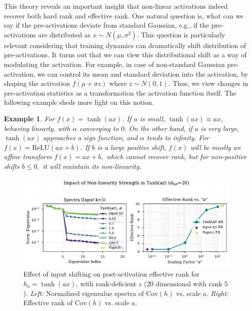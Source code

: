 \documentclass{article}
\newtheorem{example}{Example}[section] %
\numberwithin{figure}{section}
\begin{document}
This theory reveals an important insight that non-linear activations indeed recover both hard rank and effective rank.  One natural question is, what can we say if the pre-activations deviate from standard Gaussian, e.g., if the pre-activations are distributed as $x\sim N(\mu,\sigma^2).$ This question is particularly relevant considering that training dynamics can dramatically shift distribution of pre-activations. It turns out that we can view this distributional shift as a way of modulating the activation. For example, in case of non-standard Gaussian pre-activation, we can control its mean and standard deviation into the activation, by shaping the activation $f(\mu + \sigma z)$ where $z\sim N(0,1)$. Thus, we view  changes in pre-activation statistics as a transformation the activation function itself. The following example sheds more light on this notion.

\begin{example}
For $f(x) = \tanh(ax)$. If $a$ is small, $\tanh(ax) \approx ax$, behaving linearly, with $\alpha$ converging to $0.$ On the other hand, if $a$ is very large, $\tanh(ax)$ approaches a sign function, and $\alpha$ tends to infinity.   
For $f(x) = \text{ReLU}(a x + b)$. If $b $ is a large positive shift, $f(x)$ will be mostly an affine transform $f(x) = a x + b, $ which cannot recover rank, but for non-positive shifts $b \le 0, $ it will maintain its non-linearity. 
\end{example}

\begin{figure}[ht!]
    \centering
\includegraphics[width=0.7\linewidth]{POC/figures/theory_tanh_az_rank.pdf} %
    \vspace{-.3cm}
    \caption{Effect of input shifting on post-activation effective rank for $h_a = \tanh(a x)$, with rank-deficient $z$ ($20$ dimensional with rank $5$). \emph{Left:} Normalized eigenvalue spectra of $\mathrm{Cov}(h)$ vs. scale $a.$ \emph{Right:} Effective rank of $\mathrm{Cov}(h)$ vs. scale $a$. }
    \label{fig:theory_tanh_az_rank}
\end{figure}
\end{document}
